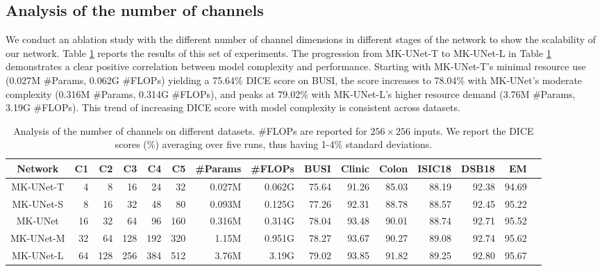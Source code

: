 \clearpage
\setcounter{page}{1}
\maketitlesupplementary



\subsection{Analysis of the number of channels}
\label{assec:number_of_channels}
We conduct an ablation study with the different number of channel dimensions in different stages of the network to show the scalability of our network.
Table \ref{tab:ablation_channels} reports the results of this set of experiments. The progression from MK-UNet-T to MK-UNet-L in Table \ref{tab:ablation_channels} demonstrates a clear positive correlation between model complexity and performance. Starting with MK-UNet-T's minimal resource use (0.027M \#Params, 0.062G \#FLOPs) yielding a 75.64\% DICE score on BUSI, the score increases to 78.04\% with MK-UNet's moderate complexity (0.316M \#Params, 0.314G \#FLOPs), and peaks at 79.02\% with MK-UNet-L's higher resource demand (3.76M \#Params, 3.19G \#FLOPs). This trend of increasing DICE score with model complexity is consistent across datasets.



\begin{table}[!b]
\begin{center}
    \begin{adjustbox}{width=0.9\textwidth}
\begin{tabular}{c|r|r|r|r|r|r|r|r|r|r|r|r|r|r}
\toprule
Network     & C1    & C2 & C3 & C4 & C5  & \#Params & \#FLOPs & BUSI & Clinic & Colon & ISIC18 & DSB18 & EM                  \\
\midrule
MK-UNet-T           & 4  & 8 & 16  &  24 & 32     &  0.027M  & 0.062G & 75.64 & 91.26 &  85.03 & 88.19 & 92.38 & 94.69 \\
MK-UNet-S          & 8  & 16  & 32   & 48 & 80     &  0.093M & 0.125G & 77.26 & 92.31 & 88.78 & 88.57 & 92.45 & 95.22 \\
MK-UNet          & 16 & 32 & 64 & 96   & 160     & 0.316M & 0.314G &  78.04 & 93.48 &  90.01 & 88.74 & 92.71 & 95.52 \\
MK-UNet-M          & 32  & 64  & 128  &  192   & 320    & 1.15M  & 0.951G &  78.27 & 93.67 & 90.27 & 89.08 & 92.74 & 95.62 \\
MK-UNet-L          & 64  & 128  & 256 & 384  & 512    & 3.76M & 3.19G &  79.02 & 93.85 & 91.82 & 89.25 & 92.80 & 95.67 \\
\bottomrule 
\end{tabular}
\end{adjustbox}
\caption{Analysis of the number of channels on different datasets. \#FLOPs are reported for $256\times256$ inputs. We report the DICE scores (\%) averaging over five runs, thus having 1-4\% standard deviations.}
\label{tab:ablation_channels}
\end{center}
\end{table}


